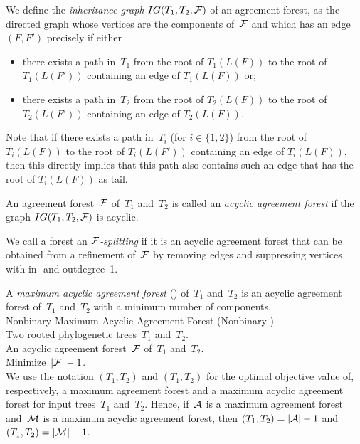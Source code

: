 We define the \emph{inheritance graph} $IG(T_1,T_2,{\mathcal F})$ of an agreement forest, as the directed graph whose vertices are the components of~${\mathcal F}$ and which has an edge~$(F,F')$ precisely if either
\begin{itemize}
\item there exists a path in~$T_1$ from the root of $T_1(L(F))$ to the root of $T_1(L(F'))$ containing an edge of $T_1(L(F))$ or;
\item there exists a path in~$T_2$ from the root of $T_2(L(F))$ to the root of $T_2(L(F'))$ containing an edge of $T_2(L(F))$.
\end{itemize}

Note that if there exists a path in~$T_i$ (for $i\in\{1,2\}$) from the root of $T_i(L(F))$ to the root of $T_i(L(F'))$ containing an edge of $T_i(L(F))$, then this directly implies that this path also contains such an edge that has the root of $T_i(L(F))$ as tail.

An agreement forest~${\mathcal F}$ of~$T_1$ and~$T_2$ is called an \emph{acyclic agreement forest} if the graph $IG(T_1,T_2,{\mathcal F})$ is acyclic.

We call a forest an {\em ${\mathcal F}$-splitting} if it is an acyclic agreement forest that can be obtained from a refinement of~${\mathcal F}$ by removing edges and suppressing vertices with in- and outdegree~1.

A \emph{maximum acyclic agreement forest} (\maaf) of~$T_1$ and~$T_2$ is an acyclic agreement forest of~$T_1$ and~$T_2$ with a minimum number of components. \\

 {\sc Nonbinary Maximum Acyclic Agreement Forest} (Nonbinary \maaf)\\
 Two rooted phylogenetic trees~$T_1$ and~$T_2$. \\
 An acyclic agreement forest~${\mathcal F}$ of~$T_1$ and~$T_2$.\\
 Minimize~$|{\mathcal F}|-1$.\\

We use the notation \maf$(T_1,T_2)$ and \maaf$(T_1,T_2)$ for the optimal objective value of, respectively, a maximum agreement forest and a maximum acyclic agreement forest for input trees~$T_1$ and~$T_2$. Hence, if~${\mathcal A}$ is a maximum agreement forest and~${\mathcal M}$ is a maximum acyclic agreement forest, then \maf$(T_1,T_2)=|{\mathcal A}|-1$ and \maaf$(T_1,T_2)=|{\mathcal M}|-1$.



